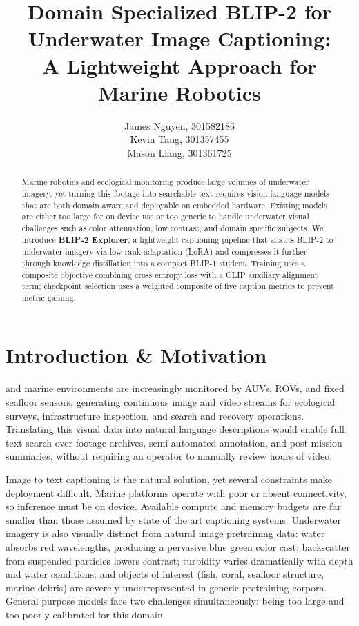 \documentclass[journal]{IEEEtran}
\begin{document}
\title{Domain Specialized BLIP-2 for Underwater Image Captioning:\\A Lightweight Approach for Marine Robotics}

\author{James Nguyen, 301582186\\ Kevin Tang, 301357455\\ Mason Liang, 301361725}


\maketitle

\begin{abstract}
Marine robotics and ecological monitoring produce large volumes of underwater imagery, yet turning this footage into searchable text requires vision language models that are both domain aware and deployable on embedded hardware. Existing models are either too large for on device use or too generic to handle underwater visual challenges such as color attenuation, low contrast, and domain specific subjects. We introduce \textbf{BLIP-2 Explorer}, a lightweight captioning pipeline that adapts BLIP-2 to underwater imagery via low rank adaptation (LoRA) and compresses it further through knowledge distillation into a compact BLIP-1 student. Training uses a composite objective combining cross entropy loss with a CLIP auxiliary alignment term; checkpoint selection uses a weighted composite of five caption metrics to prevent metric gaming.
\end{abstract}

\section{Introduction \& Motivation}

 and marine environments are increasingly monitored by AUVs, ROVs, and fixed seafloor sensors, generating continuous image and video streams for ecological surveys, infrastructure inspection, and search and recovery operations. Translating this visual data into natural language descriptions would enable full text search over footage archives, semi automated annotation, and post mission summaries, without requiring an operator to manually review hours of video.

Image to text captioning is the natural solution, yet several constraints make deployment difficult. Marine platforms operate with poor or absent connectivity, so inference must be on device. Available compute and memory budgets are far smaller than those assumed by state of the art captioning systems. Underwater imagery is also visually distinct from natural image pretraining data: water absorbs red wavelengths, producing a pervasive blue green color cast; backscatter from suspended particles lowers contrast; turbidity varies dramatically with depth and water conditions; and objects of interest (fish, coral, seafloor structure, marine debris) are severely underrepresented in generic pretraining corpora. General purpose models face two challenges simultaneously: being too large and too poorly calibrated for this domain.
\end{document}
